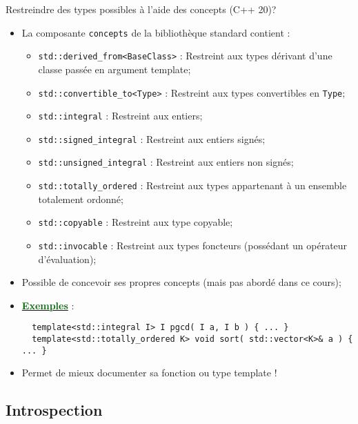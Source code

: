 \documentclass[compress,10pt,aspectratio=169]{beamer}
\begin{document}
\begin{frame}[fragile]{Restreindre des types possibles à l'aide des concepts (C++ 20)?}
  \scriptsize
  
  \begin{itemize}
  \item La composante \texttt{concepts} de la bibliothèque standard contient :
  \begin{itemize}
  \scriptsize 
  \item \texttt{std::derived\_from<BaseClass>} : Restreint aux types dérivant d'une classe passée en argument template;
  \item \texttt{std::convertible\_to<Type>} : Restreint aux types convertibles en \texttt{Type};
  \item \texttt{std::integral} : Restreint aux entiers;
  \item \texttt{std::signed\_integral} : Restreint aux entiers signés;
  \item \texttt{std::unsigned\_integral} : Restreint aux entiers non signés;
  \item \texttt{std::totally\_ordered} : Restreint aux types appartenant à un ensemble totalement ordonné;
  \item \texttt{std::copyable} : Restreint aux type copyable;
  \item \texttt{std::invocable} : Restreint aux types foncteurs (possédant un opérateur d'évaluation);
  \end{itemize}
  \item Possible de concevoir ses propres concepts (mais pas abordé dans ce cours);
  \item \underline{\textcolor{DarkGreen}{\bf Exemples}} : 
  \begin{verbatim}
  template<std::integral I> I pgcd( I a, I b ) { ... }
  template<std::totally_ordered K> void sort( std::vector<K>& a ) { ... } 
  \end{verbatim}
  \item Permet de mieux documenter sa fonction ou type template !
  \end{itemize}
\end{frame}

\subsection{Introspection}
\end{document}
